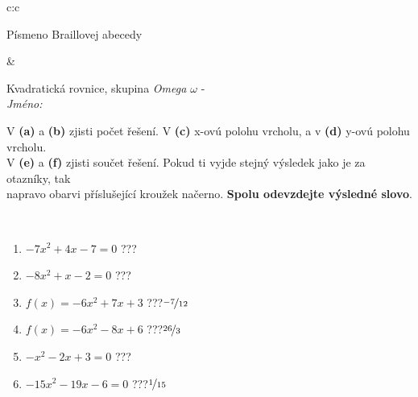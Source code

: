 \documentclass[10pt]{report}
\begin{document}
\begin{tabular}{c:c}
\begin{minipage}[c][104.5mm][t]{0.5\linewidth}
\begin{center}
\begin{minipage}{0.20\linewidth}
\begin{center}
{\small Písmeno Braillovej abecedy}
\end{center}
\end{minipage}
\end{center}
\end{minipage}
&
\begin{minipage}[c][104.5mm][t]{0.5\linewidth}
\begin{center}
\vspace{7mm}
{\huge Kvadratická rovnice, skupina \textit{Omega $\omega$} -}\\[5mm]
\textit{Jméno:}\phantom{xxxxxxxxxxxxxxxxxxxxxxxxxxxxxxxxxxxxxxxxxxxxxxxxxxxxxxxxxxxxxxxxx}\\[5mm]
\begin{minipage}{0.95\linewidth}
\begin{center}
V \textbf{(a)} a \textbf{(b)} zjisti počet řešení. V \textbf{(c)} x-ovú polohu vrcholu, a v \textbf{(d)} y-ovú polohu vrcholu.\\V \textbf{(e)} a \textbf{(f)} zjisti součet řešení. Pokud ti vyjde stejný výsledek jako je za otazníky, tak\\napravo obarvi příslušející kroužek načerno. \textbf{Spolu odevzdejte výsledné slovo}.
\end{center}
\end{minipage}
\\[1mm]
\begin{minipage}{0.79\linewidth}
\begin{center}
\begin{varwidth}{\linewidth}
\begin{enumerate}
\Large
\item $-7x^2+4x-7=0$\quad \dotfill\; ???\;\dotfill {}
\item $-8x^2+x-2=0$\quad \dotfill\; ???\;\dotfill {}
\item $f(x)=-6x^2+7x+3$\quad \dotfill\; ???\;\dotfill \quad $\nicefrac{-7}{12}$
\item $f(x)=-6x^2-8x+6$\quad \dotfill\; ???\;\dotfill \quad $\nicefrac{26}{3}$
\item $-x^2-2x+3=0$\quad \dotfill\; ???\;\dotfill {}
\item $-15x^2-19x-6=0$\quad \dotfill\; ???\;\dotfill \quad $\nicefrac{1}{15}$
\end{enumerate}
\end{varwidth}
\end{center}
\end{minipage}
\begin{minipage}{0.20\linewidth}

\end{minipage}
\end{center}
\end{minipage}
\end{tabular}
\end{document}
